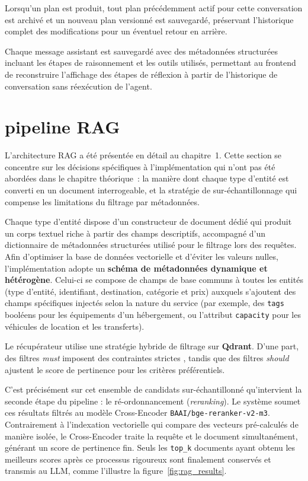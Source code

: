 Lorsqu'un plan est produit, tout plan précédemment actif pour cette conversation est archivé
et un nouveau plan versionné est sauvegardé, préservant l'historique complet des modifications
pour un éventuel retour en arrière.

Chaque message assistant est sauvegardé avec des métadonnées structurées incluant les étapes
de raisonnement et les outils utilisés, permettant au frontend de reconstruire l'affichage
des étapes de réflexion à partir de l'historique de conversation sans réexécution de l'agent.


\section{pipeline RAG}

L'architecture RAG a été présentée en détail au chapitre~1. Cette section se concentre sur les
décisions spécifiques à l'implémentation qui n'ont pas été abordées dans le chapitre
théorique~: la manière dont chaque type d'entité est converti en un document interrogeable, et
la stratégie de sur-échantillonnage qui compense les limitations du filtrage par métadonnées.

Chaque type d'entité dispose d'un constructeur de document dédié qui produit un corps textuel
riche à partir des champs descriptifs, accompagné d'un dictionnaire de métadonnées
structurées utilisé pour le filtrage lors des requêtes. Afin d'optimiser la base de données vectorielle 
et d'éviter les valeurs nulles, l'implémentation adopte un \textbf{schéma de métadonnées dynamique et hétérogène}. 
Celui-ci se compose de champs de base communs à toutes les entités (type d'entité, identifiant, 
destination, catégorie et prix) auxquels s'ajoutent des champs spécifiques injectés selon la nature 
du service (par exemple, des \texttt{tags} booléens pour les équipements d'un hébergement, ou 
l'attribut \texttt{capacity} pour les véhicules de location et les transferts).

Le récupérateur utilise une stratégie hybride de filtrage sur \textbf{Qdrant}. 
D'une part, des filtres \textit{must} imposent des contraintes strictes , 
tandis que des filtres \textit{should} ajustent le score de pertinence pour les critères 
préférentiels. 

C'est précisément sur cet ensemble de candidats sur-échantillonné qu'intervient la seconde étape du pipeline : 
le ré-ordonnancement (\textit{reranking}). Le système soumet ces résultats filtrés au modèle 
Cross-Encoder \texttt{BAAI/bge-reranker-v2-m3}. Contrairement à l'indexation vectorielle qui compare des vecteurs 
pré-calculés de manière isolée, le Cross-Encoder traite la requête et le document simultanément, générant un score de 
pertinence fin. Seuls les \texttt{top\_k} documents ayant obtenu les meilleurs scores après ce processus rigoureux sont 
finalement conservés et transmis au LLM, comme l'illustre la figure~\ref{fig:rag_results}.

